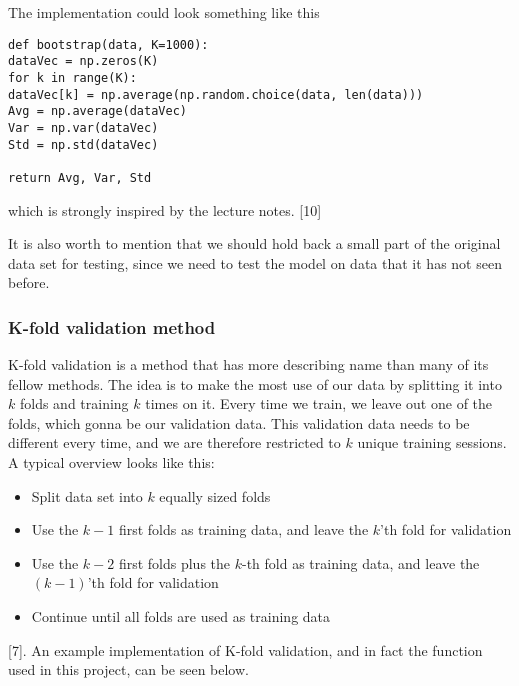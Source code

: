 The implementation could look something like this
\lstset{basicstyle=\scriptsize}
\begin{lstlisting}
def bootstrap(data, K=1000):
dataVec = np.zeros(K)
for k in range(K):
dataVec[k] = np.average(np.random.choice(data, len(data)))
Avg = np.average(dataVec)
Var = np.var(dataVec)
Std = np.std(dataVec)

return Avg, Var, Std
\end{lstlisting}
which is strongly inspired by the lecture notes. [10]

It is also worth to mention that we should hold back a small part of the original data set for testing, since we need to test the model on data that it has not seen before.

\subsubsection{K-fold validation method} \label{sec:kfold}
K-fold validation is a method that has more describing name than many of its fellow methods. The idea is to make the most use of our data by splitting it into $k$ folds and training $k$ times on it. Every time we train, we leave out one of the folds, which gonna be our validation data. This validation data needs to be different every time, and we are therefore restricted to $k$ unique training sessions. A typical overview looks like this:
\begin{itemize}
	\item Split data set into $k$ equally sized folds
	\item Use the $k-1$ first folds as training data, and leave the $k$'th fold for validation
	\item Use the $k-2$ first folds plus the $k$-th fold as training data, and leave the $(k-1)$'th fold for validation
	\item Continue until all folds are used as training data
\end{itemize}
[7]. An example implementation of K-fold validation, and in fact the function used in this project, can be seen below.

